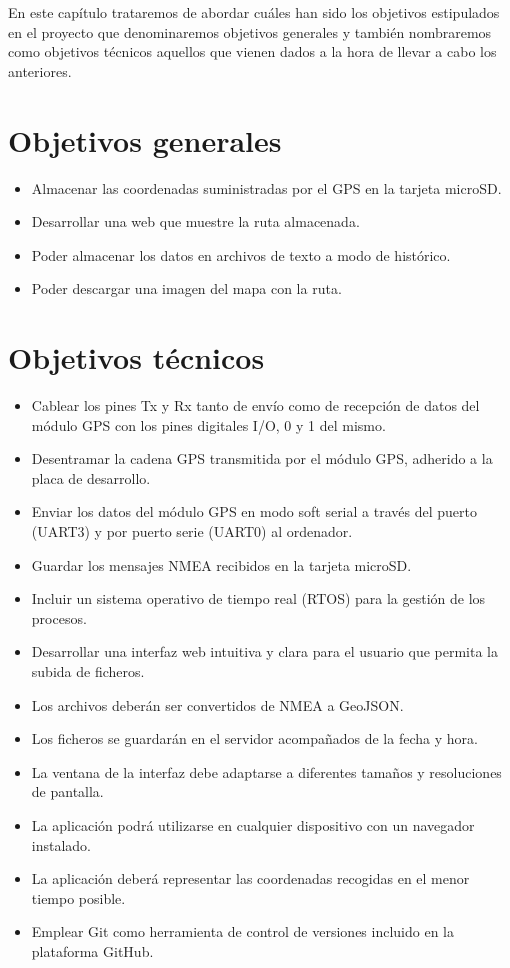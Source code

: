 
En este capítulo trataremos de abordar cuáles han sido los objetivos estipulados en el proyecto que denominaremos objetivos generales y también nombraremos como objetivos técnicos aquellos que vienen dados a la hora de llevar a cabo los anteriores.

\section{Objetivos generales}
\begin{itemize}
\tightlist
\item
    Almacenar las coordenadas suministradas por el GPS en la tarjeta microSD. 
\item
	Desarrollar una web que muestre la ruta almacenada.
\item
    Poder almacenar los datos en archivos de texto a modo de histórico.
\item
    Poder descargar una imagen del mapa con la ruta.
\end{itemize}

\clearpage

\section{Objetivos técnicos}
\begin{itemize}
\tightlist
\item
	Cablear los pines Tx y Rx tanto de envío como de recepción de datos del módulo GPS con los pines digitales I/O, 0 y 1 del mismo.
\item
	Desentramar la cadena GPS transmitida por el módulo GPS, adherido a la placa de desarrollo.
\item
	Enviar los datos del módulo GPS en modo soft serial a través del puerto (UART3) y por puerto serie (UART0) al ordenador.
\item
	Guardar los mensajes NMEA recibidos en la tarjeta microSD.
\item
	Incluir un sistema operativo de tiempo real (RTOS) para la gestión de los procesos.
\item
    Desarrollar una interfaz web intuitiva y clara para el usuario que permita la subida de ficheros.
\item
	Los archivos deberán ser convertidos de NMEA a GeoJSON.
\item
	Los ficheros se guardarán en el servidor acompañados de la fecha y hora.
\item
    La ventana de la interfaz debe adaptarse a diferentes tamaños y resoluciones de pantalla.
\item
    La aplicación podrá utilizarse en cualquier dispositivo con un navegador instalado.
\item
    La aplicación deberá representar las coordenadas recogidas en el menor tiempo posible.
\item
    Emplear Git como herramienta de control de versiones incluido en la plataforma GitHub.
\end{itemize}

